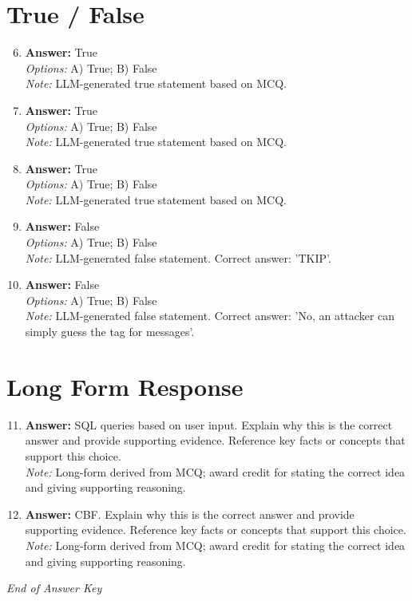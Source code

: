 \documentclass[12pt]{article}
\begin{document}
\section*{True / False}
\begin{enumerate}[label=\arabic*.]
\setcounter{enumi}{5}
\item \textbf{Answer:} True
\\ \textit{Options:} A) True; B) False
\\ \textit{Note:} LLM-generated true statement based on MCQ.
\item \textbf{Answer:} True
\\ \textit{Options:} A) True; B) False
\\ \textit{Note:} LLM-generated true statement based on MCQ.
\item \textbf{Answer:} True
\\ \textit{Options:} A) True; B) False
\\ \textit{Note:} LLM-generated true statement based on MCQ.
\item \textbf{Answer:} False
\\ \textit{Options:} A) True; B) False
\\ \textit{Note:} LLM-generated false statement. Correct answer: 'TKIP'.
\item \textbf{Answer:} False
\\ \textit{Options:} A) True; B) False
\\ \textit{Note:} LLM-generated false statement. Correct answer: 'No, an attacker can simply guess the tag for messages'.
\end{enumerate}

\section*{Long Form Response}
\begin{enumerate}[label=\arabic*.]
\setcounter{enumi}{10}
\item \textbf{Answer:} SQL queries based on user input. Explain why this is the correct answer and provide supporting evidence. Reference key facts or concepts that support this choice.
\\ \textit{Note:} Long-form derived from MCQ; award credit for stating the correct idea and giving supporting reasoning.
\item \textbf{Answer:} CBF. Explain why this is the correct answer and provide supporting evidence. Reference key facts or concepts that support this choice.
\\ \textit{Note:} Long-form derived from MCQ; award credit for stating the correct idea and giving supporting reasoning.
\end{enumerate}

\vfill
\noindent\textit{End of Answer Key}
\end{document}
